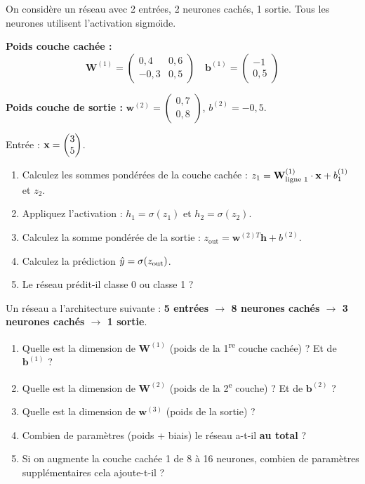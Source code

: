 On consid\`{e}re un r\'{e}seau avec 2 entr\'{e}es, 2 neurones cach\'{e}s, 1 sortie.
Tous les neurones utilisent l'activation sigmo\"{\i}de.

\textbf{Poids couche cach\'{e}e :}
\[
    \mathbf{W}^{(1)} = \begin{pmatrix} 0{,}4 & 0{,}6 \\ -0{,}3 & 0{,}5 \end{pmatrix}
    \quad
    \mathbf{b}^{(1)} = \begin{pmatrix} -1 \\ 0{,}5 \end{pmatrix}
\]

\textbf{Poids couche de sortie :}
$\mathbf{w}^{(2)} = \begin{pmatrix} 0{,}7 \\ 0{,}8 \end{pmatrix}$,
$b^{(2)} = -0{,}5$.

Entr\'{e}e : $\mathbf{x} = \begin{pmatrix} 3 \\ 5 \end{pmatrix}$.

\begin{enumerate}[label=\alph*)]
    \item Calculez les sommes pond\'{e}r\'{e}es de la couche cach\'{e}e :
        $z_1 = \mathbf{W}^{(1)}_{\text{ligne 1}} \cdot \mathbf{x} + b_1^{(1)}$ et $z_2$.
    \item Appliquez l'activation : $h_1 = \sigma(z_1)$ et $h_2 = \sigma(z_2)$.
    \item Calculez la somme pond\'{e}r\'{e}e de la sortie :
        $z_{\text{out}} = \mathbf{w}^{(2)T}\mathbf{h} + b^{(2)}$.
    \item Calculez la pr\'{e}diction $\hat{y} = \sigma(z_{\text{out}})$.
    \item Le r\'{e}seau pr\'{e}dit-il classe 0 ou classe 1 ?
\end{enumerate}


Un r\'{e}seau a l'architecture suivante : \textbf{5 entr\'{e}es $\to$ 8 neurones cach\'{e}s $\to$ 3 neurones cach\'{e}s $\to$ 1 sortie}.

\begin{enumerate}[label=\alph*)]
    \item Quelle est la dimension de $\mathbf{W}^{(1)}$ (poids de la 1\textsuperscript{re} couche cach\'{e}e) ?
        Et de $\mathbf{b}^{(1)}$ ?
    \item Quelle est la dimension de $\mathbf{W}^{(2)}$ (poids de la 2\textsuperscript{e} couche) ?
        Et de $\mathbf{b}^{(2)}$ ?
    \item Quelle est la dimension de $\mathbf{w}^{(3)}$ (poids de la sortie) ?
    \item Combien de param\`{e}tres (poids + biais) le r\'{e}seau a-t-il \textbf{au total} ?
    \item Si on augmente la couche cach\'{e}e 1 de 8 \`{a} 16 neurones,
        combien de param\`{e}tres suppl\'{e}mentaires cela ajoute-t-il ?
\end{enumerate}


